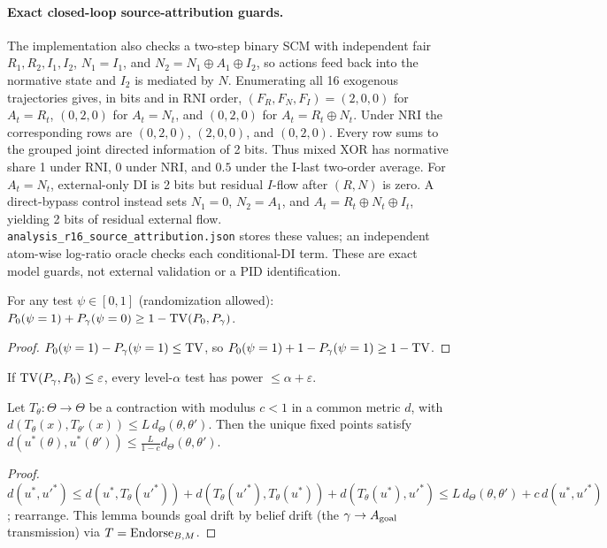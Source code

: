 \paragraph{Exact closed-loop source-attribution guards.}\label{app:source-guards}
The implementation also checks a two-step binary SCM with independent fair
$R_1,R_2,I_1,I_2$, $N_1=I_1$, and
$N_2=N_1\oplus A_1\oplus I_2$, so actions feed back into the normative state
and $I_2$ is mediated by $N$. Enumerating all 16 exogenous trajectories gives,
in bits and in RNI order, $(F_R,F_N,F_I)=(2,0,0)$ for $A_t=R_t$, $(0,2,0)$ for
$A_t=N_t$, and $(0,2,0)$ for $A_t=R_t\oplus N_t$. Under NRI the corresponding
rows are $(0,2,0)$, $(2,0,0)$, and $(0,2,0)$. Every row sums to the grouped
joint directed information of 2 bits. Thus mixed XOR has normative share 1
under RNI, 0 under NRI, and $0.5$ under the I-last two-order average. For
$A_t=N_t$, external-only DI is 2 bits but residual $I$-flow after $(R,N)$ is
zero. A direct-bypass control instead sets $N_1=0$, $N_2=A_1$, and
$A_t=R_t\oplus N_t\oplus I_t$, yielding 2 bits of residual external flow.
\texttt{analysis\_r16\_source\_attribution.json} stores these values; an
independent atom-wise log-ratio oracle checks each conditional-DI term. These
are exact model guards, not external validation or a PID identification.

\begin{lemma}\label{lem:tv-testing}
For any test $\psi\in[0,1]$ (randomization allowed):
$P_0(\psi=1)+P_\gamma(\psi=0)\ge 1-\mathrm{TV}(P_0,P_\gamma)$.
\end{lemma}
\begin{proof}
$P_0(\psi=1)-P_\gamma(\psi=1)\le\mathrm{TV}$, so
$P_0(\psi=1)+1-P_\gamma(\psi=1)\ge 1-\mathrm{TV}$.
\end{proof}

\begin{corollary}
If $\mathrm{TV}(P_\gamma,P_0)\le\varepsilon$, every level-$\alpha$ test has power
$\le\alpha+\varepsilon$.
\end{corollary}

\begin{lemma}
\label{lem:contraction}
Let $T_\theta:\Theta\to\Theta$ be a contraction with modulus $c<1$ in a common
metric $d$, with $d(T_\theta(x),T_{\theta'}(x))\le L\,d_\Theta(\theta,\theta')$.
Then the unique fixed points satisfy
$d(u^*(\theta),u^*(\theta'))\le\frac{L}{1-c}d_\Theta(\theta,\theta')$.
\end{lemma}
\begin{proof}
$d(u^*,u'^*)\le d(u^*,T_\theta(u'^*))+d(T_\theta(u'^*),T_\theta(u^*))
+d(T_\theta(u^*),u'^*)\le L\,d_\Theta(\theta,\theta')+c\,d(u^*,u'^*)$;
rearrange. This lemma bounds goal drift by belief drift (the $\gamma\to A_{\mathrm{goal}}$
transmission) via $T=\mathrm{Endorse}_{B,M}$.
\end{proof}

